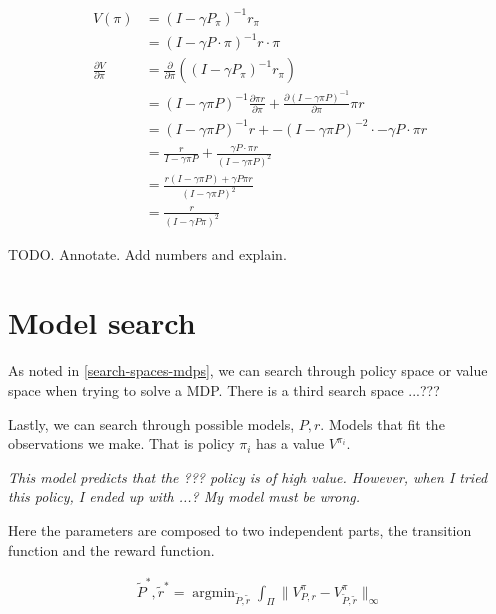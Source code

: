 \begin{align*}
V(\pi) &= (I − \gamma P_{\pi})^{−1}r_{\pi} \tag{value functional}\\
&= (I − \gamma P\cdot \pi)^{−1}r\cdot \pi \\
\frac{\partial V}{\partial \pi} &= \frac{\partial}{\partial \pi}((I-\gamma P_{\pi})^{-1} r_{\pi}) \\
&= (I-\gamma \pi P)^{-1} \frac{\partial \pi r}{\partial \pi}+   \frac{\partial (I-\gamma \pi P)^{-1}}{\partial \pi}\pi r\tag{product rule} \\
&= (I-\gamma \pi P)^{-1} r + -(I-\gamma \pi P)^{-2} \cdot -\gamma P\cdot \pi r\\
&= \frac{r}{I-\gamma \pi P} + \frac{ \gamma P\cdot \pi r}{(I-\gamma \pi P)^2} \tag{rewrite as fractions}\\
&= \frac{r(I-\gamma \pi P) + \gamma P \pi r}{(I-\gamma \pi P)^2} \tag{common demoninator}\\
& = \frac{r}{(I-\gamma P \pi)^2} \tag{cancel}
\end{align*}

TODO. Annotate. Add numbers and explain.



\section{Model search}

As noted in \ref{search-spaces-mdps}, we can search through policy space or value
space when trying to solve a MDP. There is a third search space ...???



Lastly, we can search through possible models, $P, r$. Models that fit the
observations we make. That is policy $\pi_i$ has a value $V^{\pi_i}$.

\begin{displayquote}
  \textit{This model predicts that the ??? policy is of high value.
  However, when I tried this policy, I ended up with ...?
  My model must be wrong.}
\end{displayquote}

Here the parameters are composed to two independent parts, the transition function
and the reward function.

\begin{align}
\tilde P^{* }, \tilde r^{* } = \mathop{\text{argmin}}_{\tilde P, \tilde r} \int_{\Pi} \parallel V^{\pi}_{P, r} -V^{\pi}_{\tilde P, \tilde r} \parallel_\infty
\end{align}

